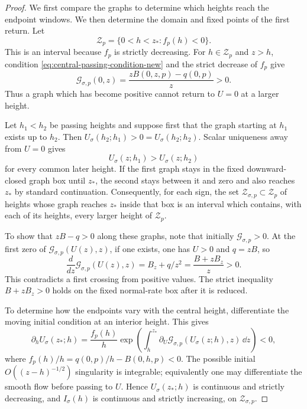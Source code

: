 \begin{proof}
We first compare the graphs to determine which heights reach the
endpoint windows. We then determine the domain and fixed points of the
first return. Let
\[
 \mathcal Z_p=\{0<h<z_*:f_p(h)<0\}.
\]
This is an interval because $f_p$ is strictly decreasing.  For $h\in
\mathcal Z_p$ and $z>h$, condition
\eqref{eq:central-passing-condition-new} and the strict
decrease of $f_p$ give
\begin{equation}
\label{eq:graph-positive-at-axis-new}
 \mathcal G_{\sigma,p}(0,z)
 =\frac{zB(0,z,p)-q(0,p)}{z}>0.
\end{equation}
Thus a graph which has become positive cannot return to $U=0$ at a larger
height.

Let $h_1<h_2$ be passing heights and suppose first that the graph starting at
$h_1$ exists up to $h_2$.  Then
$U_\sigma(h_2;h_1)>0=U_\sigma(h_2;h_2)$.  Scalar uniqueness away from
$U=0$ gives
\begin{equation}
\label{eq:central-graph-order-new}
 U_\sigma(z;h_1)>U_\sigma(z;h_2)
\end{equation}
for every common later height. If the first graph stays in the fixed
downward-closed graph box until $z_*$, the second stays between it and
zero and also reaches $z_*$ by standard continuation. Consequently, for
each sign, the set $\mathcal Z_{\sigma,p}\subset\mathcal Z_p$ of heights
whose graph reaches $z_*$ inside that box is an interval which
contains, with each of its heights, every larger height of
$\mathcal Z_p$.

To show that \(zB-q>0\) along these graphs, note that initially
\(\mathcal G_{\sigma,p}>0\). At the first zero of
\(\mathcal G_{\sigma,p}(U(z),z)\), if one exists,
one has \(U>0\) and \(q=zB\), so
\begin{equation}
\label{eq:graph-slope-first-zero}
 \frac{d}{dz}\mathcal G_{\sigma,p}(U(z),z)
   =B_z+q/z^2=\frac{B+zB_z}{z}>0.
\end{equation}
This contradicts a first crossing from positive values. The strict
inequality \(B+zB_z>0\) holds on the fixed normal-rate box after
it is reduced.

To determine how the endpoints vary with the central height, differentiate
the moving initial condition at an interior height. This gives
\begin{equation}
\label{eq:moving-height-variation-new}
 \partial_hU_\sigma(z_*;h)
 =\frac{f_p(h)}h\exp\!\left(
  \int_h^{z_*}\partial_U\mathcal G_{\sigma,p}
       (U_\sigma(z;h),z)\,\dd z\right)<0,
\end{equation}
where $f_p(h)/h=q(0,p)/h-B(0,h,p)<0$.
The possible initial $O((z-h)^{-1/2})$ singularity is integrable; equivalently
one may differentiate the smooth flow before passing to $U$.
Hence $U_\sigma(z_*;h)$ is continuous and
strictly decreasing, and $I_\sigma(h)$ is continuous and strictly increasing,
on $\mathcal Z_{\sigma,p}$.


\end{proof}

